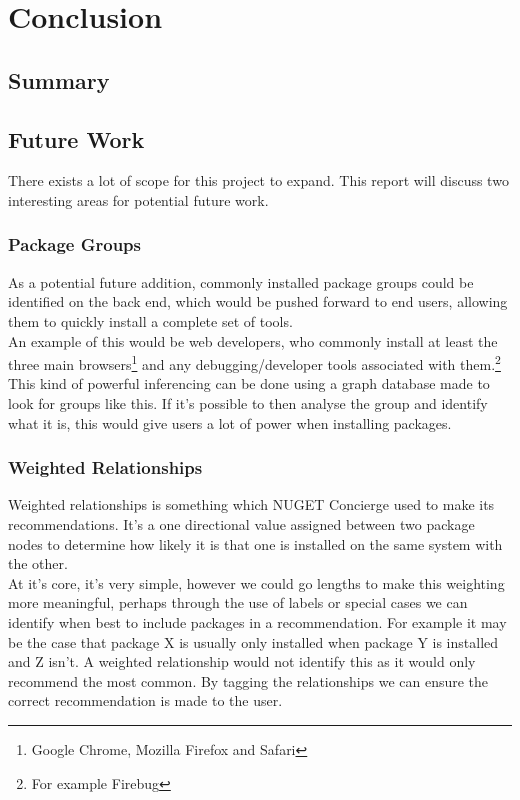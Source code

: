 \documentclass{l4proj}
\begin{document}
 
\chapter{Conclusion}

\section{Summary}
\section{Future Work}
There exists a lot of scope for this project to expand. This report will discuss two interesting areas for potential future work.

\subsection{Package Groups}
As a potential future addition, commonly installed package groups could be identified on the back end, which would be pushed forward to end users, allowing them to quickly install a complete set of tools.\\
An example of this would be web developers, who commonly install at least the three main browsers\footnote{Google Chrome, Mozilla Firefox and Safari} and any debugging/developer tools associated with them.\footnote{For example Firebug}\\
This kind of powerful inferencing can be done using a graph database made to look for groups like this. If it's possible to then analyse the group and identify what it is, this would give users a lot of power when installing packages.  

\subsection{Weighted Relationships} 
Weighted relationships is something which NUGET Concierge used to make its recommendations. It's a one directional value assigned between two package nodes to determine how likely it is that one is installed on the same system with the other.\\
At it's core, it's very simple, however we could go lengths to make this weighting more meaningful, perhaps through the use of labels or special cases we can identify when best to include packages in a recommendation. For example it may be the case that package X is usually only installed when package Y is installed and Z isn't. A weighted relationship would not identify this as it would only recommend the most common. By tagging the relationships we can ensure the correct recommendation is made to the user.
\end{document}
